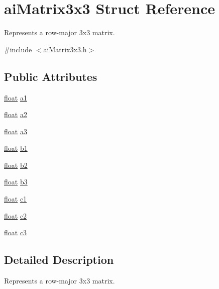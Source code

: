 \hypertarget{structai_matrix3x3}{\section{ai\-Matrix3x3 Struct Reference}
\label{structai_matrix3x3}
}


Represents a row-\/major 3x3 matrix.  




{\ttfamily \#include $<$ai\-Matrix3x3.\-h$>$}

\subsection*{Public Attributes}
\begin{DoxyCompactItemize}
\item 
\hyperlink{fmod_8h_aeb841aa4b4b5f444b5d739d865b420af}{float} \hyperlink{structai_matrix3x3_a6884258a2f50758ed8b554b531186917}{a1}
\item 
\hyperlink{fmod_8h_aeb841aa4b4b5f444b5d739d865b420af}{float} \hyperlink{structai_matrix3x3_a4c74733870193040ba4953fb673e77df}{a2}
\item 
\hyperlink{fmod_8h_aeb841aa4b4b5f444b5d739d865b420af}{float} \hyperlink{structai_matrix3x3_a851d391df32a39e1ced1a9a286b38cf4}{a3}
\item 
\hyperlink{fmod_8h_aeb841aa4b4b5f444b5d739d865b420af}{float} \hyperlink{structai_matrix3x3_a9eeba340d3502017caad70416f03863a}{b1}
\item 
\hyperlink{fmod_8h_aeb841aa4b4b5f444b5d739d865b420af}{float} \hyperlink{structai_matrix3x3_a9f5e25b60bbd7bdf8f0a19cd82cc6b15}{b2}
\item 
\hyperlink{fmod_8h_aeb841aa4b4b5f444b5d739d865b420af}{float} \hyperlink{structai_matrix3x3_a21aa4345fe6ce2774db94d118c536d02}{b3}
\item 
\hyperlink{fmod_8h_aeb841aa4b4b5f444b5d739d865b420af}{float} \hyperlink{structai_matrix3x3_ae62a2877076cbee151e89cb34567e3ca}{c1}
\item 
\hyperlink{fmod_8h_aeb841aa4b4b5f444b5d739d865b420af}{float} \hyperlink{structai_matrix3x3_a8e0d85d5c46eb4f4478f1fe159be4320}{c2}
\item 
\hyperlink{fmod_8h_aeb841aa4b4b5f444b5d739d865b420af}{float} \hyperlink{structai_matrix3x3_aa7eef894dec22db1011092410b24f19b}{c3}
\end{DoxyCompactItemize}


\subsection{Detailed Description}
Represents a row-\/major 3x3 matrix. 

